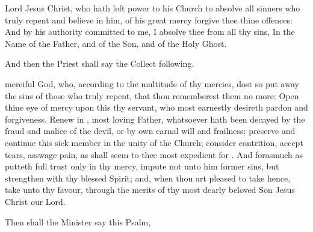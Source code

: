  Lord Jesus Christ, who hath left power to his Church to absolve all sinners who truly repent and believe in him, of his great mercy forgive thee thine offences: And by his authority committed to me, I absolve thee from all thy sins, In the Name of the Father, and of the Son, and of the Holy Ghost.

\begin{rubric}
And then the Priest shall say the Collect following.
\end{rubric}


 merciful God, who, according to the multitude of thy mercies, dost so put away the sins of those who truly repent, that thou rememberest them no more: Open thine eye of mercy upon this thy servant, who most earnestly desireth pardon and forgiveness.
Renew in , most loving Father, whatsoever hath been decayed by the fraud and malice of the devil, or by  own carnal will and frailness; preserve and continue this sick member in the unity of the Church; consider  contrition, accept  tears, asswage  pain, as shall seem to thee most expedient for .
And forasmuch as  putteth  full trust only in thy mercy, impute not unto him  former sins, but strengthen  with thy blessed Spirit; and, when thou art pleased to take  hence, take  unto thy favour, through the merits of thy most dearly beloved Son Jesus Christ our Lord.

\begin{rubric}
Then shall the Minister say this Psalm,
\end{rubric}

